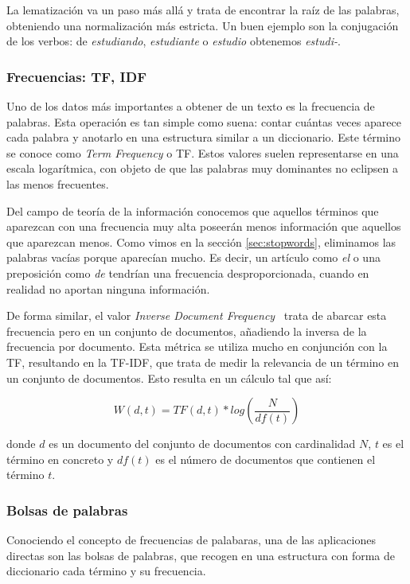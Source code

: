 La lematización va un paso más allá y trata de encontrar la raíz de las palabras, obteniendo una normalización más estricta. Un buen ejemplo son la conjugación de los verbos: de \textit{estudiando}, \textit{estudiante} o \textit{estudio} obtenemos \textit{estudi-}. \cite{Lemmatization2014} 


\subsubsection{Frecuencias: TF, IDF}
Uno de los datos más importantes a obtener de un texto es la frecuencia de palabras. Esta operación es tan simple como suena: contar cuántas veces aparece cada palabra y anotarlo en una estructura similar a un diccionario. Este término se conoce como \textit{Term Frequency} o TF. Estos valores suelen representarse en una escala logarítmica, con objeto de que las palabras muy dominantes no eclipsen a las menos frecuentes.

Del campo de teoría de la información \cite{information2001} conocemos que aquellos términos que aparezcan con una frecuencia muy alta poseerán menos información que aquellos que aparezcan menos. Como vimos en la sección \ref{sec:stopwords}, eliminamos las palabras vacías porque aparecían mucho. Es decir, un artículo como \textit{el} o una preposición como \textit{de} tendrían una frecuencia desproporcionada, cuando en realidad no aportan ninguna información. 


De forma similar, el valor \textit{Inverse Document Frequency}~\cite{Jones2004ASI} trata de abarcar esta frecuencia pero en un conjunto de documentos, añadiendo la inversa de la frecuencia por documento. Esta métrica se utiliza mucho en conjunción con la TF, resultando en la TF-IDF, que trata de medir la relevancia de un término en un conjunto de documentos. Esto resulta en un cálculo tal que así:

\begin{equation}
    W(d, t) = TF(d, t) * log(\frac{N}{df(t)})
\end{equation}

donde $d$ es un documento del conjunto de documentos con cardinalidad $N$, $t$ es el término en concreto y $df(t)$ es el número de documentos que contienen el término $t$.


\subsubsection{Bolsas de palabras}
Conociendo el concepto de frecuencias de palabaras, una de las aplicaciones directas son las bolsas de palabras, que recogen en una estructura con forma de diccionario cada término y su frecuencia.

